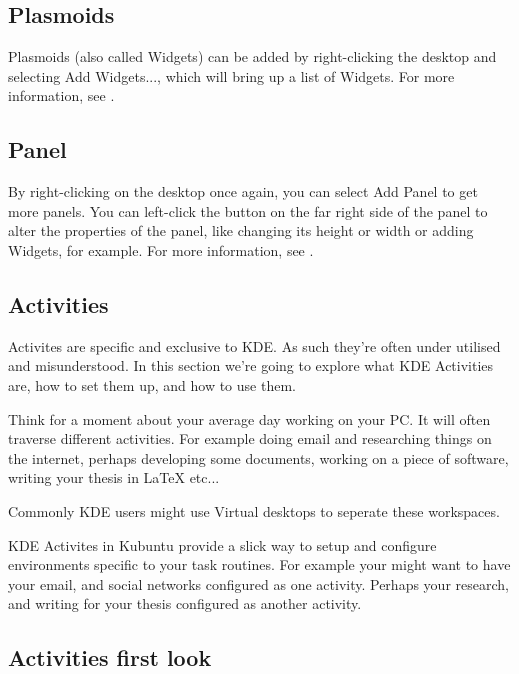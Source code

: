 \documentclass[letterpaper,10pt,english]{sphinxmanual}
\begin{document}
\subsection{Plasmoids}
\label{\detokenize{docs/basic:plasmoids}}
Plasmoids (also called Widgets) can be added by right-clicking the desktop and selecting Add Widgets..., which will bring up a list of Widgets. For more information, see .


\subsection{Panel}
\label{\detokenize{docs/basic:panel}}

By right-clicking on the desktop once again, you can select Add Panel to get more panels. You can left-click the button on the far right side of the panel to alter the properties of the panel, like changing its height or width or adding Widgets, for example. For more information, see .


\subsection{Activities}
\label{\detokenize{docs/basic:activities}}
Activites are specific and exclusive to KDE. As such they're often under utilised and misunderstood. In this section we're going to explore what KDE Activities are, how to set them up, and how to use them.

Think for a moment about your average day working on your PC. It will often traverse different activities. For example doing email and researching things on the internet, perhaps developing some documents, working on a piece of software, writing your thesis in LaTeX etc...

Commonly KDE users might use Virtual desktops to seperate these workspaces.

KDE Activites in Kubuntu provide a slick way to setup and configure environments specific to your task routines. For example your might want to have your email, and social networks configured as one activity. Perhaps your research, and writing for your thesis configured as another activity.


\subsection{Activities first look}
\label{\detokenize{docs/basic:activities-first-look}}
\end{document}
